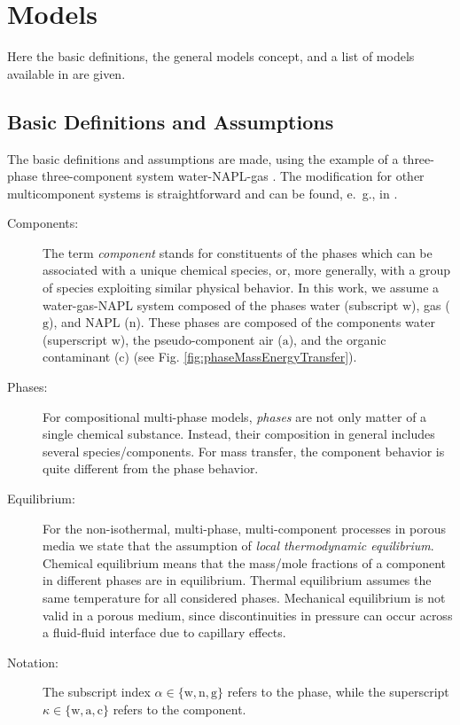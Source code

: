 \section{Models}
Here the basic definitions, the general models concept, and a list of
models available in \Dumux are given.

\subsection{Basic Definitions and Assumptions}
The basic definitions and assumptions are made, using the example
of a three-phase three-component system water-NAPL-gas
\cite{A3:class:2002a}. The modification for other multicomponent
systems is straightforward and can be found, e.\ g., in
\cite{A3:bielinski:2006,A3:acosta:2006}.

\begin{description}
\item[Components:]
The term \emph{component} stands for constituents of the phases which
can be associated with a unique chemical species, or, more generally, with
a group of species exploiting similar physical behavior. In this work, we
assume a water-gas-NAPL system composed of the phases water (subscript
$\text{w}$), gas ($\text{g}$), and NAPL ($\text{n}$). These phases are
composed of the components water (superscript $\text{w}$), the pseudo-component
air ($\text{a}$), and the organic contaminant ($\text{c}$) (see Fig.
\ref{fig:phaseMassEnergyTransfer}).

\item[Phases:]
For compositional multi-phase models, \emph{phases}
are not only matter of a single chemical substance. Instead, their
composition in general includes several species/components. For mass transfer,
the component behavior is quite different from the phase behavior.

\item[Equilibrium:]
For the non-isothermal, multi-phase, multi-component processes in porous media
we state that the assumption of \emph{local thermodynamic equilibrium}.
Chemical equilibrium means that the mass/mole fractions of a component in
different phases are in equilibrium.
Thermal equilibrium assumes the same temperature for all considered phases.
Mechanical equilibrium is not valid in a porous medium, since discontinuities
in pressure can occur across a fluid-fluid interface due to capillary effects.

\item[Notation:]
The subscript index $\alpha \in \{\text{w}, \text{n}, \text{g}\}$ refers
to the phase, while the superscript $\kappa \in \{\text{w}, \text{a}, \text{c}\}$
refers to the component.
\end{description}

